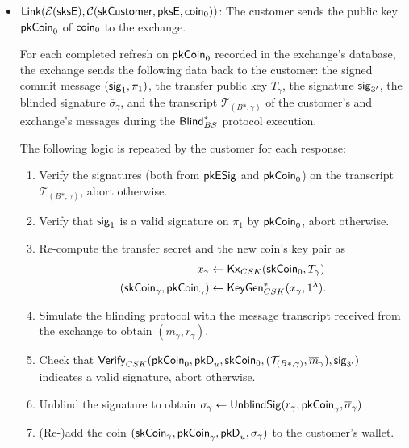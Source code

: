 \begin{itemize}
  \item $\mathsf{Link}(\mathcal{E}(\mathsf{sksE}), \mathcal{C}(\mathsf{skCustomer}, \mathsf{pksE}, \mathsf{coin}_0))$:
    The customer sends the public key $\mathsf{pkCoin}_0$ of $\mathsf{coin}_0$ to the exchange.

    For each completed refresh on $\mathsf{pkCoin}_0$ recorded in the exchange's
    database, the exchange sends the following data back to the customer: the
    signed commit message $(\mathsf{sig}_1, \pi_1)$, the transfer public key
    $T_\gamma$, the signature $\mathsf{sig}_{3'}$, the blinded signature $\overline{\sigma}_\gamma$, and the
    transcript $\mathcal{T}_{(B*,\gamma)}$ of the customer's and exchange's messages
    during the $\mathsf{Blind}^*_{BS}$ protocol execution.

    The following logic is repeated by the customer for each response:
    \begin{enumerate}
      \item Verify the signatures (both from $\mathsf{pkESig}$ and $\mathsf{pkCoin}_0$) on the transcript $\mathcal{T}_{(B*,\gamma)}$,
        abort otherwise.
      \item Verify that $\mathsf{sig}_1$ is a valid signature on $\pi_1$ by $\mathsf{pkCoin}_0$, abort otherwise.
      \item Re-compute the transfer secret and the new coin's key pair as
        \begin{align*}
          x_\gamma &\leftarrow \mathsf{Kx}_{CSK}(\mathsf{skCoin}_0, T_\gamma)\\
          (\mathsf{skCoin}_\gamma, \mathsf{pkCoin}_\gamma) &\leftarrow \mathsf{KeyGen}_{CSK}^*(x_\gamma, 1^\lambda).
        \end{align*}
      \item Simulate the blinding protocol with the message transcript received from the exchange to obtain
        $(\overline{m}_\gamma, r_\gamma)$.
      \item Check that $\mathsf{Verify}_{CSK}(\mathsf{pkCoin}_0,
        \mathsf{pkD}_u, \mathsf{skCoin}_0,(\mathcal{T}_{(B*,\gamma)}, \overline{m}_\gamma), \mathsf{sig}_{3'})$
        indicates a valid signature, abort otherwise.
      \item Unblind the signature to obtain $\sigma_\gamma \leftarrow \mathsf{UnblindSig}(r_\gamma, \mathsf{pkCoin}_\gamma, \overline{\sigma}_\gamma)$
      \item (Re-)add the coin $(\mathsf{skCoin}_\gamma, \mathsf{pkCoin}_\gamma, \mathsf{pkD}_u, \sigma_\gamma)$ to the customer's wallet.
    \end{enumerate}

\end{itemize}

